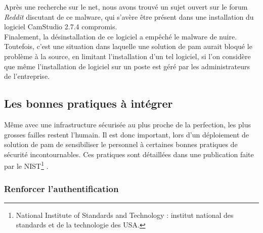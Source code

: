 Après une recherche sur le net, nous avons trouvé un sujet ouvert sur le forum \emph{Reddit} discutant de ce malware, qui s'avère être présent dans une installation du logiciel CamStudio 2.7.4 compromis.\\
Finalement, la désinstallation de ce logiciel a empêché le malware de nuire. Toutefois, c'est une situation dans laquelle une solution de \gls{pam} aurait bloqué le problème à la source, en limitant l'installation d'un tel logiciel, si l'on considère que même l'installation de logiciel sur un poste est géré par les administrateurs de l'entreprise.

\subsection{Les bonnes pratiques à intégrer}
\label{subsec:pratiques}

Même avec une infrastructure sécurisée au plus proche de la perfection, les plus grosses failles restent l'humain. Il est donc important, lors d'un déploiement de solution de \gls{pam} de sensibiliser le personnel à certaines bonnes pratiques de sécurité incontournables. Ces pratiques sont détaillées dans une publication faite par le \textsc{NIST}\footnote{National Institute of Standards and Technology : institut national des standards et de la technologie des USA.} \cite{nist}.

\subsubsection{Renforcer l'authentification}
\label{par:auth}

